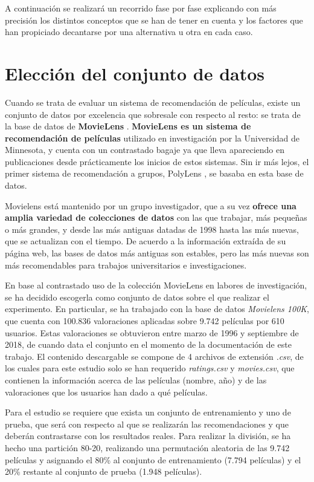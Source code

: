 A continuación se realizará un recorrido fase por fase explicando con más precisión los distintos conceptos que se han de tener en cuenta y los factores que han propiciado decantarse por una alternativa u otra en cada caso.

\section{Elección del conjunto de datos}

Cuando se trata de evaluar un sistema de recomendación de películas, existe un conjunto de datos por excelencia que sobresale con respecto al resto: se trata de la base de datos de \textbf{MovieLens} \cite{movielens} \cite{movielens-paper}. \textbf{MovieLens es un sistema de recomendación de películas} utilizado en investigación por la Universidad de Minnesota, y cuenta con un contrastado bagaje ya que lleva apareciendo en publicaciones desde prácticamente los inicios de estos sistemas. Sin ir más lejos, el primer sistema de recomendación a grupos, PolyLens \cite{polylens}, se basaba en esta base de datos.

Movielens está mantenido por un grupo investigador, que a su vez \textbf{ofrece una amplia variedad de colecciones de datos} con las que trabajar, más pequeñas o más grandes, y desde las más antiguas datadas de 1998 hasta las más nuevas, que se actualizan con el tiempo. De acuerdo a la información extraída de su página web, las bases de datos más antiguas son estables, pero las más nuevas son más recomendables para trabajos universitarios e investigaciones.

En base al contrastado uso de la colección MovieLens en labores de investigación, se ha decidido escogerla como conjunto de datos sobre el que realizar el experimento. En particular, se ha trabajado con la base de datos \textit{Movielens 100K}, que cuenta con 100.836 valoraciones aplicadas sobre 9.742 películas por 610 usuarios. Estas valoraciones se obtuvieron entre marzo de 1996 y septiembre de 2018, de cuando data el conjunto en el momento de la documentación de este trabajo. El contenido descargable se compone de 4 archivos de extensión \textit{.csv}, de los cuales para este estudio solo se han requerido \textit{ratings.csv} y \textit{movies.csv}, que contienen la información acerca de las películas (nombre, año) y de las valoraciones que los usuarios han dado a qué películas.

Para el estudio se requiere que exista un conjunto de entrenamiento y uno de prueba, que será con respecto al que se realizarán las recomendaciones y que deberán contrastarse con los resultados reales. Para realizar la división, se ha hecho una partición 80-20, realizando una permutación aleatoria de las 9.742 películas y asignando el 80\% al conjunto de entrenamiento (7.794 películas) y el 20\% restante al conjunto de prueba (1.948 películas).

